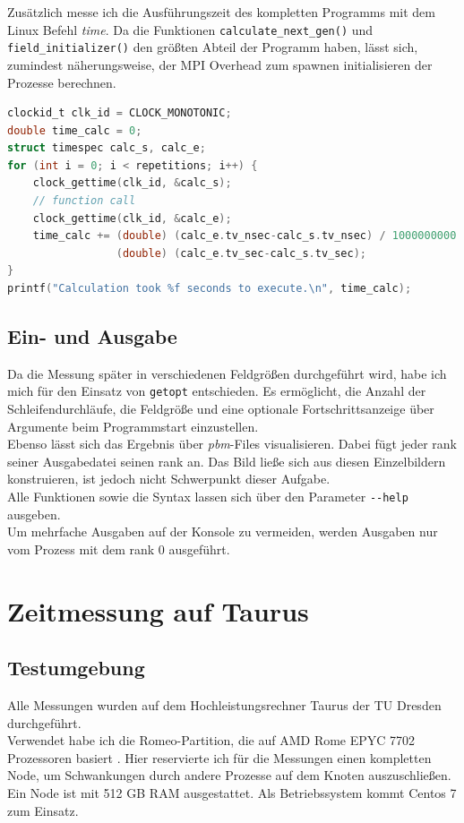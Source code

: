 \documentclass[german,plainarticle,hyperref,utf8]{zihpub}
\begin{document}
	Zusätzlich messe ich die Ausführungszeit des kompletten Programms mit dem Linux Befehl \textit{time}. Da die Funktionen \texttt{calculate\_next\_gen()} und \texttt{field\_initializer()} den größten Abteil der Programm haben, lässt sich, zumindest näherungsweise, der MPI Overhead zum spawnen initialisieren der Prozesse berechnen.
	\begin{lstlisting}[language=C, caption=Berechnung der Ausführungszeit eines \textit{function calls}]
clockid_t clk_id = CLOCK_MONOTONIC;
double time_calc = 0;
struct timespec calc_s, calc_e;
for (int i = 0; i < repetitions; i++) {
	clock_gettime(clk_id, &calc_s);
	// function call
	clock_gettime(clk_id, &calc_e);
	time_calc += (double) (calc_e.tv_nsec-calc_s.tv_nsec) / 1000000000 +
	             (double) (calc_e.tv_sec-calc_s.tv_sec);
}
printf("Calculation took %f seconds to execute.\n", time_calc);
\end{lstlisting}
	
	\subsection{Ein- und Ausgabe}
	Da die Messung später in verschiedenen Feldgrößen durchgeführt wird, habe ich mich für den Einsatz von \verb|getopt| entschieden. Es ermöglicht, die Anzahl der Schleifendurchläufe, die Feldgröße und eine optionale Fortschrittsanzeige über Argumente beim Programmstart einzustellen.\\
	Ebenso lässt sich das Ergebnis über \textit{pbm}-Files visualisieren. Dabei fügt jeder rank seiner Ausgabedatei seinen rank an. Das Bild ließe sich aus diesen Einzelbildern konstruieren, ist jedoch nicht Schwerpunkt dieser Aufgabe.\\
	Alle Funktionen sowie die Syntax lassen sich über den Parameter \texttt{-{}-help} ausgeben.\\
	
	Um mehrfache Ausgaben auf der Konsole zu vermeiden, werden Ausgaben nur vom Prozess mit dem rank 0 ausgeführt.
	\newpage
	\section{Zeitmessung auf Taurus}
	\subsection{Testumgebung} \label{umgebung}
	Alle Messungen wurden auf dem Hochleistungsrechner Taurus der TU Dresden durchgeführt.\\
	Verwendet habe ich die Romeo-Partition, die auf AMD Rome EPYC 7702 Prozessoren basiert \cite{hpc}. Hier reservierte ich für die Messungen einen kompletten Node, um Schwankungen durch andere Prozesse auf dem Knoten auszuschließen. Ein Node ist mit 512 GB RAM ausgestattet. Als Betriebssystem kommt Centos 7 zum Einsatz.\\
	
\end{document}
